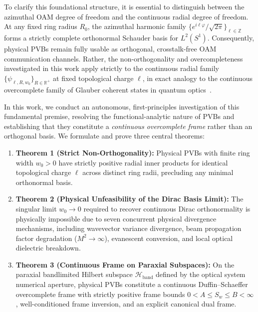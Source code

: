 \documentclass{optica-article}
\begin{document}
To clarify this foundational structure, it is essential to distinguish between the azimuthal OAM degree of freedom and the continuous radial degree of freedom. At any fixed ring radius $R_0$, the azimuthal harmonic family $\{e^{i\ell\varphi}/\sqrt{2\pi}\}_{\ell \in \mathbb{Z}}$ forms a strictly complete orthonormal Schauder basis for $L^2(S^1)$. Consequently, physical PVBs remain fully usable as orthogonal, crosstalk-free OAM communication channels. Rather, the non-orthogonality and overcompleteness investigated in this work apply strictly to the continuous radial family $\{\psi_{\ell, R, w_0}\}_{R \in \mathbb{R}^+}$ at fixed topological charge $\ell$, in exact analogy to the continuous overcomplete family of Glauber coherent states in quantum optics~\cite{Klauder1985,Perelomov1986}.

In this work, we conduct an autonomous, first-principles investigation of this fundamental premise, resolving the functional-analytic nature of PVBs and establishing that they constitute a \emph{continuous overcomplete frame} rather than an orthogonal basis. We formulate and prove three central theorems:
\begin{enumerate}
    \item \textbf{Theorem 1 (Strict Non-Orthogonality):} Physical PVBs with finite ring width $w_0 > 0$ have strictly positive radial inner products for identical topological charge $\ell$ across distinct ring radii, precluding any minimal orthonormal basis.
    \item \textbf{Theorem 2 (Physical Unfeasibility of the Dirac Basis Limit):} The singular limit $w_0 \to 0$ required to recover continuous Dirac orthonormality is physically impossible due to seven concurrent physical divergence mechanisms, including wavevector variance divergence, beam propagation factor degradation ($M^2 \to \infty$), evanescent conversion, and local optical dielectric breakdown.
    \item \textbf{Theorem 3 (Continuous Frame on Paraxial Subspaces):} On the paraxial bandlimited Hilbert subspace $\mathcal{H}_{\text{band}}$ defined by the optical system numerical aperture, physical PVBs constitute a continuous Duffin--Schaeffer overcomplete frame with strictly positive frame bounds $0 < A \le S_w \le B < \infty$, well-conditioned frame inversion, and an explicit canonical dual frame.
\end{enumerate}
\end{document}
